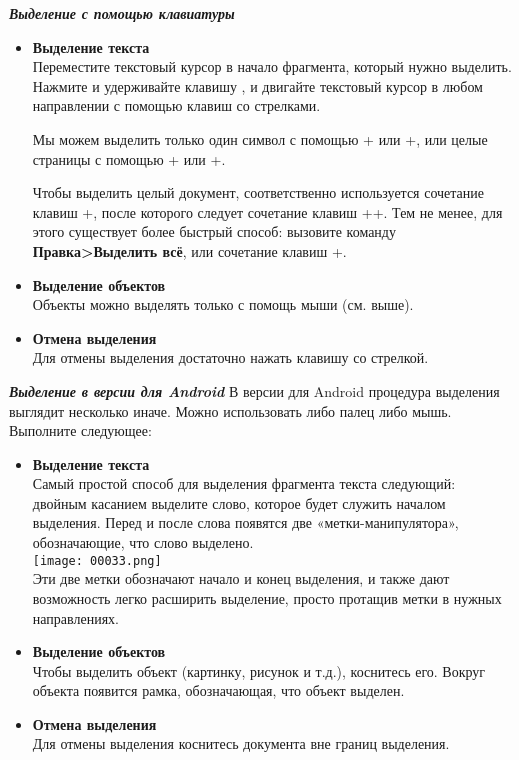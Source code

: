 ﻿\documentclass[a4paper,10pt]{article}
\begin{document}
\textbf{\textit{Выделение с помощью клавиатуры}}

\begin{itemize}
 \item \textbf{Выделение текста}\\
 Переместите текстовый курсор в начало фрагмента, который нужно выделить. Нажмите и удерживайте клавишу , и двигайте текстовый курсор в любом направлении с помощью клавиш со стрелками.
 
Мы можем выделить только один символ с помощью +\keys{\arrowkeyleft} или +\keys{\arrowkeyright}, или целые страницы с помощью + или +.

Чтобы выделить целый документ, соответственно используется сочетание клавиш +, после которого следует сочетание клавиш ++. Тем не менее, для этого существует более быстрый способ: вызовите команду \textbf{Правка>Выделить всё}, или сочетание клавиш +.
\item \textbf{Выделение объектов}\\
Объекты можно выделять только с помощь мыши (см. выше).
\item \textbf{Отмена выделения}\\
Для отмены выделения достаточно нажать клавишу со стрелкой.
\end{itemize}

\textbf{\textit{Выделение в версии для Android}}
В версии для Android процедура выделения выглядит несколько иначе. Можно использовать либо палец либо мышь. Выполните следующее:
\begin{itemize}
 \item \textbf{Выделение текста}\\
Самый простой способ для выделения фрагмента текста следующий:\\
двойным касанием выделите слово, которое будет служить началом выделения. Перед и после слова появятся две «метки-манипулятора», обозначающие, что слово выделено.\\
\texttt{[image: 00033.png]}\\
Эти две метки обозначают начало и конец выделения, и также дают возможность легко расширить выделение, просто протащив метки в нужных направлениях.
\item \textbf{Выделение объектов}\\
Чтобы выделить объект (картинку, рисунок и т.д.), коснитесь его. Вокруг объекта появится рамка, обозначающая, что объект выделен.
\item \textbf{Отмена выделения}\\
Для отмены выделения коснитесь документа вне границ выделения.
\end{itemize}
\end{document}
